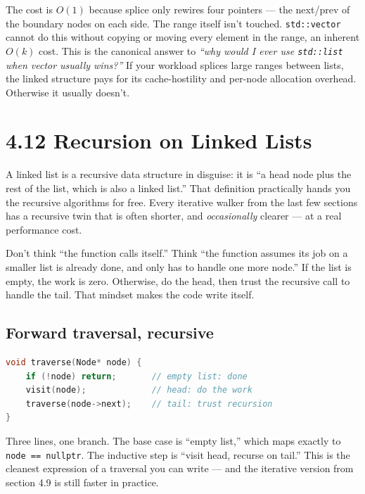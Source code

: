 \documentclass[11pt]{article}
\begin{document}
The cost is $O(1)$ because splice only rewires four pointers ---
the next/prev of the boundary nodes on each side. The range itself
isn't touched. \texttt{std::vector} cannot do this without copying
or moving every element in the range, an inherent $O(k)$ cost. This
is the canonical answer to \emph{``why would I ever use
\texttt{std::list} when vector usually wins?''} If your workload
splices large ranges between lists, the linked structure pays for
its cache-hostility and per-node allocation overhead. Otherwise it
usually doesn't.

\section{4.12 Recursion on Linked Lists}

A linked list is a recursive data structure in disguise: it is
``a head node plus the rest of the list, which is also a linked
list.'' That definition practically hands you the recursive
algorithms for free. Every iterative walker from the last few
sections has a recursive twin that is often shorter, and
\emph{occasionally} clearer --- at a real performance cost.

\begin{ideabox}
Don't think ``the function calls itself.'' Think ``the function
assumes its job on a smaller list is already done, and only has
to handle one more node.'' If the list is empty, the work is
zero. Otherwise, do the head, then trust the recursive call to
handle the tail. That mindset makes the code write itself.
\end{ideabox}

\subsection*{Forward traversal, recursive}

\begin{examplebox}
\begin{lstlisting}[language=C++,basicstyle=\ttfamily\small,frame=single]
void traverse(Node* node) {
    if (!node) return;       // empty list: done
    visit(node);             // head: do the work
    traverse(node->next);    // tail: trust recursion
}
\end{lstlisting}
\end{examplebox}

Three lines, one branch. The base case is ``empty list,'' which
maps exactly to \texttt{node == nullptr}. The inductive step is
``visit head, recurse on tail.'' This is the cleanest expression
of a traversal you can write --- and the iterative version from
section 4.9 is still faster in practice.
\end{document}
